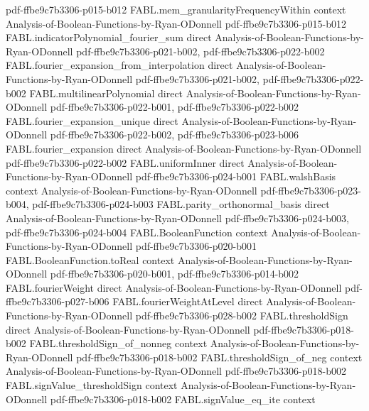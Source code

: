 \begin{theorem}
  {pdf-ffbe9c7b3306-p015-b012}
\proofstep
  {FABL.mem_granularityFrequencyWithin}
  {context}
  {Analysis-of-Boolean-Functions-by-Ryan-ODonnell}
  {pdf-ffbe9c7b3306-p015-b012}
\proofstep
  {FABL.indicatorPolynomial_fourier_sum}
  {direct}
  {Analysis-of-Boolean-Functions-by-Ryan-ODonnell}
  {pdf-ffbe9c7b3306-p021-b002,
    pdf-ffbe9c7b3306-p022-b002}
\proofstep
  {FABL.fourier_expansion_from_interpolation}
  {direct}
  {Analysis-of-Boolean-Functions-by-Ryan-ODonnell}
  {pdf-ffbe9c7b3306-p021-b002,
    pdf-ffbe9c7b3306-p022-b002}
\proofstep
  {FABL.multilinearPolynomial}
  {direct}
  {Analysis-of-Boolean-Functions-by-Ryan-ODonnell}
  {pdf-ffbe9c7b3306-p022-b001,
    pdf-ffbe9c7b3306-p022-b002}
\proofstep
  {FABL.fourier_expansion_unique}
  {direct}
  {Analysis-of-Boolean-Functions-by-Ryan-ODonnell}
  {pdf-ffbe9c7b3306-p022-b002,
    pdf-ffbe9c7b3306-p023-b006}
\proofstep
  {FABL.fourier_expansion}
  {direct}
  {Analysis-of-Boolean-Functions-by-Ryan-ODonnell}
  {pdf-ffbe9c7b3306-p022-b002}
\proofstep
  {FABL.uniformInner}
  {direct}
  {Analysis-of-Boolean-Functions-by-Ryan-ODonnell}
  {pdf-ffbe9c7b3306-p024-b001}
\proofstep
  {FABL.walshBasis}
  {context}
  {Analysis-of-Boolean-Functions-by-Ryan-ODonnell}
  {pdf-ffbe9c7b3306-p023-b004,
    pdf-ffbe9c7b3306-p024-b003}
\proofstep
  {FABL.parity_orthonormal_basis}
  {direct}
  {Analysis-of-Boolean-Functions-by-Ryan-ODonnell}
  {pdf-ffbe9c7b3306-p024-b003,
    pdf-ffbe9c7b3306-p024-b004}
\proofstep
  {FABL.BooleanFunction}
  {context}
  {Analysis-of-Boolean-Functions-by-Ryan-ODonnell}
  {pdf-ffbe9c7b3306-p020-b001}
\proofstep
  {FABL.BooleanFunction.toReal}
  {context}
  {Analysis-of-Boolean-Functions-by-Ryan-ODonnell}
  {pdf-ffbe9c7b3306-p020-b001,
    pdf-ffbe9c7b3306-p014-b002}
\proofstep
  {FABL.fourierWeight}
  {direct}
  {Analysis-of-Boolean-Functions-by-Ryan-ODonnell}
  {pdf-ffbe9c7b3306-p027-b006}
\proofstep
  {FABL.fourierWeightAtLevel}
  {direct}
  {Analysis-of-Boolean-Functions-by-Ryan-ODonnell}
  {pdf-ffbe9c7b3306-p028-b002}
\proofstep
  {FABL.thresholdSign}
  {direct}
  {Analysis-of-Boolean-Functions-by-Ryan-ODonnell}
  {pdf-ffbe9c7b3306-p018-b002}
\proofstep
  {FABL.thresholdSign_of_nonneg}
  {context}
  {Analysis-of-Boolean-Functions-by-Ryan-ODonnell}
  {pdf-ffbe9c7b3306-p018-b002}
\proofstep
  {FABL.thresholdSign_of_neg}
  {context}
  {Analysis-of-Boolean-Functions-by-Ryan-ODonnell}
  {pdf-ffbe9c7b3306-p018-b002}
\proofstep
  {FABL.signValue_thresholdSign}
  {context}
  {Analysis-of-Boolean-Functions-by-Ryan-ODonnell}
  {pdf-ffbe9c7b3306-p018-b002}
\proofstep
  {FABL.signValue_eq_ite}
  {context}

\end{theorem}
